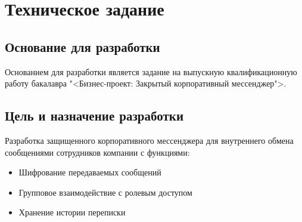 \section{Техническое задание}
\subsection{Основание для разработки}

Основанием для разработки является задание на выпускную квалификационную работу бакалавра "<Бизнес-проект: Закрытый корпоративный мессенджер">.

\subsection{Цель и назначение разработки}

Разработка защищенного корпоративного мессенджера для внутреннего обмена сообщениями сотрудников компании с функциями:
\begin{itemize}
	\item Шифрование передаваемых сообщений
	\item Групповое взаимодействие с ролевым доступом
	\item Хранение истории переписки
\end{itemize}

